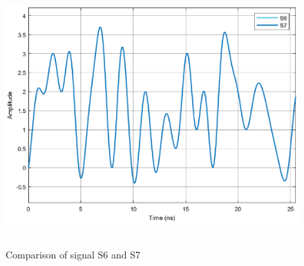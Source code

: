 \begin{refsection}
\begin{figure}[h]
	\includegraphics[height=10cm,width=12cm]{./algorithms/overlap_save/figures/S6S7_IrTf.eps}
	\caption{Comparison of signal S6 and S7}\label{S6S7_IrTf}
\end{figure}
\clearpage
\printbibliography[heading=subbibliography]
\end{refsection}
\cleardoublepage

